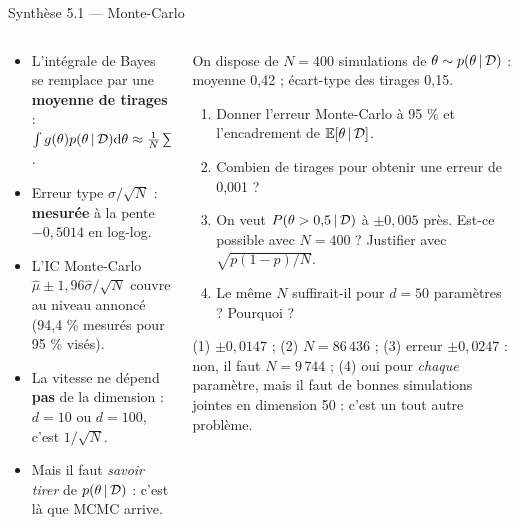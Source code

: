 \begin{frame}{Synthèse 5.1 --- Monte-Carlo}
\footnotesize
\begin{columns}[t]
\begin{column}{0.49\textwidth}
\begin{tcolorbox}[enhanced,colback=byPurple!7,colframe=byPurple,arc=2mm,
   title={\bfseries\color{white}\faLightbulb\ Synthèse},colbacktitle=byPurple,
   attach boxed title to top left={xshift=3mm,yshift=-2mm},
   boxed title style={arc=1mm,boxrule=0pt}]
\begin{itemize}
  \item L'intégrale de Bayes se remplace par une \textbf{moyenne de tirages} :
        $\int g(\theta)p(\theta \,\vert\, \mathcal{D})\mathrm{d}\theta \approx \frac1N\sum g(\theta^{(i)})$.
  \item Erreur type $\sigma/\sqrt{N}$ : \textbf{mesurée} à la pente $-0{,}5014$ en log-log.
  \item L'IC Monte-Carlo $\hat\mu \pm 1{,}96\hat\sigma/\sqrt N$ couvre au niveau annoncé
        (94,4 \% mesurés pour 95 \% visés).
  \item La vitesse ne dépend \textbf{pas} de la dimension : $d = 10$ ou $d = 100$,
        c'est $1/\sqrt N$.
  \item Mais il faut \emph{savoir tirer} de $p(\theta \,\vert\, \mathcal{D})$ : c'est là que MCMC arrive.
\end{itemize}
\end{tcolorbox}
\end{column}
\begin{column}{0.49\textwidth}
\begin{abox}
On dispose de $N = 400$ simulations de $\theta \sim p(\theta \,\vert\, \mathcal{D})$ :
moyenne 0,42 ; écart-type des tirages 0,15.
\begin{enumerate}
  \item Donner l'erreur Monte-Carlo à 95 \% et l'encadrement de $\mathbb{E}[\theta \,\vert\, \mathcal{D}]$.
  \item Combien de tirages pour obtenir une erreur de 0,001 ?
  \item On veut $P(\theta > 0{,}5 \,\vert\, \mathcal{D})$ à $\pm 0{,}005$ près. Est-ce possible
        avec $N = 400$ ? Justifier avec $\sqrt{p(1-p)/N}$.
  \item Le même $N$ suffirait-il pour $d = 50$ paramètres ? Pourquoi ?
\end{enumerate}
\vspace{1mm}
\footnotesize (1) $\pm 0{,}0147$ ; (2) $N = 86\,436$ ; (3) erreur $\pm 0{,}0247$ : non,
il faut $N = 9\,744$ ; (4) oui pour \emph{chaque} paramètre, mais il faut de bonnes
simulations jointes en dimension 50 : c'est un tout autre problème.
\end{abox}
\end{column}
\end{columns}
\end{frame}

